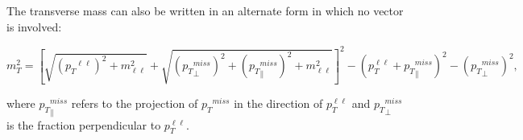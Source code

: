 \vspace{0.3cm}
The transverse mass can also be written in an alternate form in which no vector is involved:
\begin{small}
\begin{equation}
m_{T}^2 = \left[ \sqrt{({p_{T}}^{\ell\ell})^2 + m^2_{\ell\ell}}
      + \sqrt{({p_{T}}^{miss}_\perp)^2+({p_{T}}^{miss}_\parallel)^2+m^2_{\ell\ell}}\right]^2
      - \left({p}_{T}^{\ell\ell}+{p_{T}}^{miss}_\parallel\right)^2
      - ({p_{T}}^{miss}_\perp)^2,
\label{eqn:intro_MTalt}
\end{equation}
\end{small}
where ${p_{T}}^{miss}_\parallel$ refers to the projection of ${p_{T}}^{miss}$ in the direction of ${p}_{T}^{\ell\ell}$ and ${p_{T}}^{miss}_\perp$ is the fraction perpendicular to ${p}_{T}^{\ell\ell}$.



